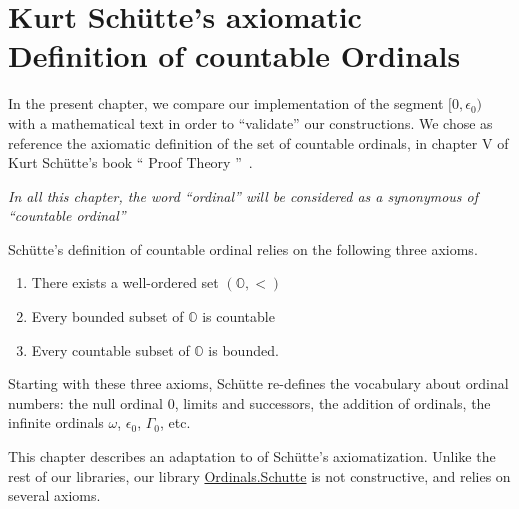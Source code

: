 \chapter[Countable Ordinals (after Sch\"{u}tte)]{Kurt Schütte's axiomatic Definition of countable Ordinals}

\label{chap:schutte} 

In the present chapter, we  compare our implementation of the segment $[0,\epsilon_0)$ with a mathematical text in order to ``validate'' our constructions.
We chose as reference the axiomatic definition of the set of countable ordinals,
in chapter V of Kurt Schütte's book `` Proof Theory ''~\cite{schutte}.

\begin{remark}
\emph{In all this chapter, the word ``ordinal'' will be considered as a synonymous of
``countable ordinal''}  
\end{remark}



Schütte's definition of countable ordinal relies on the following three axioms.




\begin{enumerate}
\item There exists a well-ordered set $(\mathbb{O},<)$
\item Every bounded subset of $\mathbb{O}$  is countable
\item Every countable subset of $\mathbb{O}$  is bounded.
\end{enumerate}

Starting with these three axioms, Schütte re-defines the vocabulary about ordinal numbers: the null ordinal $0$, limits and successors, the addition of ordinals, the infinite ordinals $\omega$, $\epsilon_0$, $\Gamma_0$, etc.

This chapter describes an adaptation to \coq{} of Schütte's axiomatization. 
 Unlike the rest of our libraries, our library
\href{../src/html/hydras.Schutte.Schutte.html}{Ordinals.Schutte}
is not constructive, and relies on several axioms.

